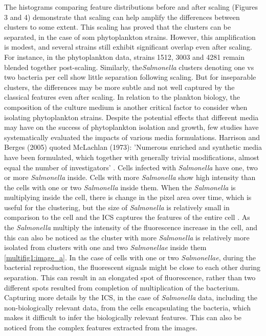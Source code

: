 \documentclass[12pt,a4paper]{article}
\begin{document}
The histograms comparing feature distributions before and after scaling (Figures 3 and 4) demonstrate that scaling can help amplify the differences between clusters to some extent. This scaling has proved that the clusters can be separated, in the case of som phytoplankton strains. However, this amplification is modest, and several strains still exhibit significant overlap even after scaling. For instance, in the phytoplankton data, strains 1512, 3003 and 4281 remain blended together post-scaling. Similarly, the\textit{Salmonella} clusters denoting one vs two bacteria per cell show little separation following scaling. But for inseparable clusters, the differences may be more subtle and not well captured by the classical features even after scaling. In relation to the plankton biology, the composition of the culture medium is another critical factor to consider when isolating phytoplankton strains. Despite the potential effects that different media may have on the success of phytoplankton isolation and growth, few studies have systematically evaluated the impacts of various media formulations. Harrison and Berges (2005) quoted McLachlan (1973): 'Numerous enriched and synthetic media have been formulated, which together with generally trivial modifications, almost equal the number of investigators' \cite{HarrisonPaul}. Cells infected with \textit{Salmonella} have one, two or more \textit{Salmonella} inside. Cells with more \textit{Salmonella} show high intensity than the cells with one or two \textit{Salmonella} inside them. When the \textit{Salmonella} is multiplying inside the cell, there is change in the pixel area over time, which is useful for the clustering, but the size of \textit{Salmonella} is relatively small in comparison to the cell and the ICS captures the features of the entire cell \cite{fàbrega_vila_2013}. As the \textit{Salmonella} multiply the intensity of the fluorescence increase in the cell, and this can also be noticed as the cluster with more \textit{Salmonella} is relatively more isolated from clusters with one and two \textit{Salmonellae} inside them \ref{multifig1:image_a}. In the case of cells with one or two \textit{Salmonellae}, during the bacterial reproduction, the fluorescent signals might be close to each other during separation. This can result in an elongated spot of fluorescence, rather than two different spots resulted from completion of multiplication of the bacterium. Capturing more details by the ICS, in the case of \textit{Salmonella} data, including the non-biologically relevant data, from the cells encapsulating the bacteria, which makes it difficult to infer the biologically relevant features. This can also be noticed from the complex features extracted from the images.
\end{document}
